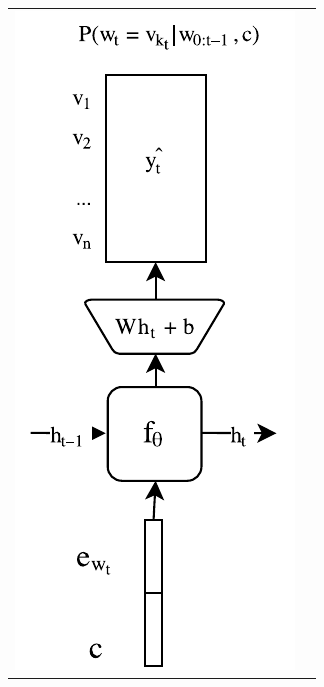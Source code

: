 \begin{figure}[h]
\centering
\begin{tabular}{p{} p{}}
\vspace{0pt} \includegraphics[scale=0.4]{studies/iwcs2017/RNN_Model_Diagram_partial.pdf} &
\vspace{0pt} \includegraphics[scale=0.4]

\end{tabular}
\end{figure}
